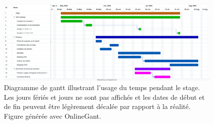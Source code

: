 \documentclass[../main]{subfiles} %
\begin{document}
\addto\extrasfrench{\protected\edef:{\unexpanded\expandafter{:}}}

\begin{figure}[ht]
    \centering
    \includegraphics[width=1\textwidth]{../Illustrations/Gantt.png}
    \caption{Diagramme de gantt illustrant l'usage du temps pendant le stage. Les jours fériés et jours ne sont pas affichés et les dates de début et de fin peuvent être légèrement décalée par rapport à la réalité. Figure générée avec \gls{OnlineGant}. }
    \label{fig:gantt}
\end{figure}


\end{document}
